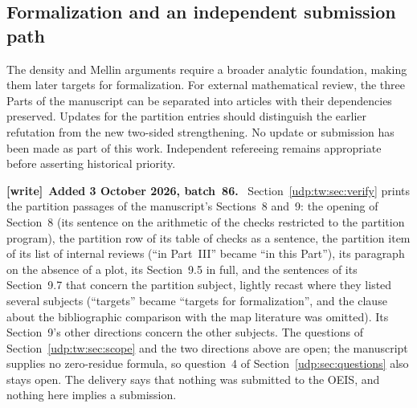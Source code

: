 \documentclass[11pt]{article}
\theoremstyle{remark}\newtheorem{remark}[theorem]{Remark}
\newenvironment{writenote}[1][]{\par\smallskip\begingroup\small
 \noindent\textbf{[write]}\if\relax\detokenize{#1}\relax\else~\textbf{#1.}\fi\ }%
 {\par\endgroup\smallskip}
\numberwithin{equation}{section}
\begin{document}
\subsection{Formalization and an independent submission path}

The density
and Mellin arguments require a broader analytic foundation, making
them later targets for formalization.
For external mathematical review, the three Parts of the manuscript can be separated
into articles with their dependencies preserved.
Updates for the partition entries should distinguish the earlier
refutation from the new two-sided strengthening. No update or
submission has been made as part of this work.
Independent refereeing remains appropriate before asserting historical priority.

\begin{writenote}[Added 3 October 2026, batch~86]
Section~\ref{udp:tw:sec:verify} prints the partition passages of the
manuscript's Sections~8 and~9: the opening of Section~8 (its sentence on
the arithmetic of the checks restricted to the partition program), the
partition row of its table of checks as a sentence, the partition item of
its list of internal reviews (``in Part~III'' became ``in this Part''), its
paragraph on the absence of a plot, its Section~9.5 in full, and the
sentences of its Section~9.7 that concern the partition subject, lightly
recast where they listed several subjects (``targets'' became ``targets
for formalization'', and the clause about the bibliographic comparison
with the map literature was omitted). Its Section~9's other directions
concern the other subjects. The questions of
Section~\ref{udp:tw:sec:scope} and the two directions above are open; the
manuscript supplies no zero-residue formula, so question~4 of
Section~\ref{udp:sec:questions} also stays open. The delivery says
that nothing was submitted to the OEIS, and nothing here implies a
submission.
\end{writenote}
\end{document}

